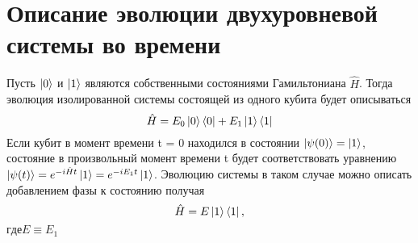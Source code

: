 \documentclass[a4paper, 10pt]{article}
\begin{document}
        \section{Описание эволюции двухуровневой системы во времени}
        Пусть $\ket{0}$ и $\ket{1}$ являются собственными состояниями Гамильтониана $\hat{H}$. Тогда эволюция изолированной системы состоящей из одного кубита будет описываться 
        \\
        \begin{equation}
            \hat{H} = E_0 \ket{0}\bra{0} + E_1 \ket{1}\bra{1}
        \end{equation}
       Если кубит в момент времени t = 0 находился в состоянии $\ket{\psi(0)} = \ket{1}$, состояние в произвольный момент времени t будет соответствовать уравнению $\ket{\psi(t)}=e^{-i\hat{H}t}\ket{1} = e^{-iE_1t}\ket{1}$. 
       Эволюцию системы в таком случае можно описать добавлением фазы к состоянию получая
        \begin{equation}
            \hat{H} = E \ket{1}\bra{1}, 
        \end{equation}
        $где E \equiv E_1$
    
\end{document}
